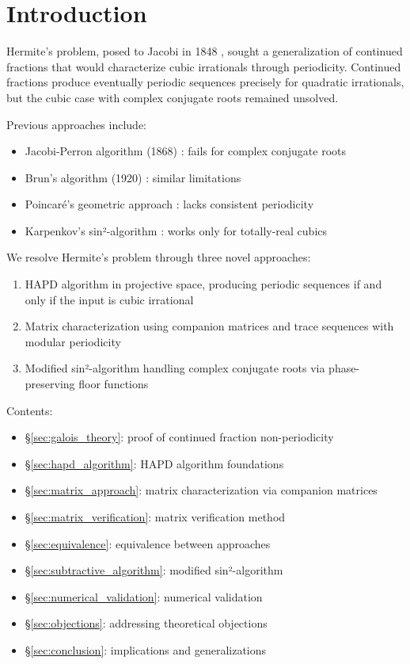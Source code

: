 \section{Introduction}\label{sec:intro}

Hermite's problem, posed to Jacobi in 1848 \cite{Hermite1848}, sought a generalization of continued fractions that would characterize cubic irrationals through periodicity. Continued fractions produce eventually periodic sequences precisely for quadratic irrationals, but the cubic case with complex conjugate roots remained unsolved.

Previous approaches include:
\begin{itemize}
\item Jacobi-Perron algorithm (1868) \cite{Jacobi1868}: fails for complex conjugate roots
\item Brun's algorithm (1920) \cite{Brentjes1981}: similar limitations
\item Poincaré's geometric approach \cite{KarpenkovBook}: lacks consistent periodicity
\item Karpenkov's sin²-algorithm \cite{Karpenkov2019}: works only for totally-real cubics
\end{itemize}

We resolve Hermite's problem through three novel approaches:
\begin{enumerate}
\item HAPD algorithm in projective space, producing periodic sequences if and only if the input is cubic irrational
\item Matrix characterization using companion matrices and trace sequences with modular periodicity
\item Modified sin²-algorithm handling complex conjugate roots via phase-preserving floor functions
\end{enumerate}

Contents:
\begin{itemize}
\item \S\ref{sec:galois_theory}: proof of continued fraction non-periodicity
\item \S\ref{sec:hapd_algorithm}: HAPD algorithm foundations
\item \S\ref{sec:matrix_approach}: matrix characterization via companion matrices
\item \S\ref{sec:matrix_verification}: matrix verification method
\item \S\ref{sec:equivalence}: equivalence between approaches
\item \S\ref{sec:subtractive_algorithm}: modified sin²-algorithm
\item \S\ref{sec:numerical_validation}: numerical validation
\item \S\ref{sec:objections}: addressing theoretical objections
\item \S\ref{sec:conclusion}: implications and generalizations
\end{itemize}
